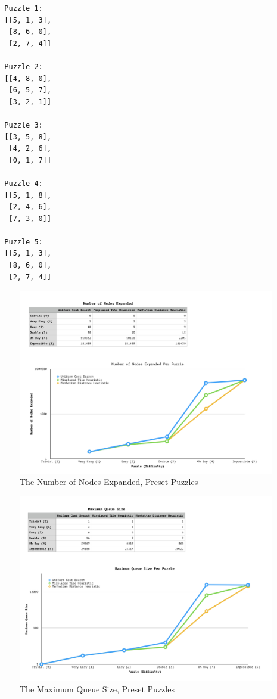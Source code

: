 \documentclass[a4paper]{article}
\begin{document}
\begin{multicols}{5}
  \begin{verbatim}
  Puzzle 1:
  [[5, 1, 3],
   [8, 6, 0],
   [2, 7, 4]]

  Puzzle 2:
  [[4, 8, 0],
   [6, 5, 7],
   [3, 2, 1]]

  Puzzle 3:
  [[3, 5, 8],
   [4, 2, 6],
   [0, 1, 7]]

  Puzzle 4:
  [[5, 1, 8],
   [2, 4, 6],
   [7, 3, 0]]

  Puzzle 5:
  [[5, 1, 3],
   [8, 6, 0],
   [2, 7, 4]]
   \end{verbatim}
 \end{multicols}

\begin{figure}
  \centering
   \caption{The Number of Nodes Expanded, Preset Puzzles}
  \includegraphics[width=\paperwidth, angle=90]{Number Nodes Expanded.png}
 
\end{figure}

\begin{figure}
  \centering
    \caption{The Maximum Queue Size, Preset Puzzles}
  \includegraphics[width=\paperwidth, angle=90]{Maximum Queue Size.png}

\end{figure}
\end{document}
